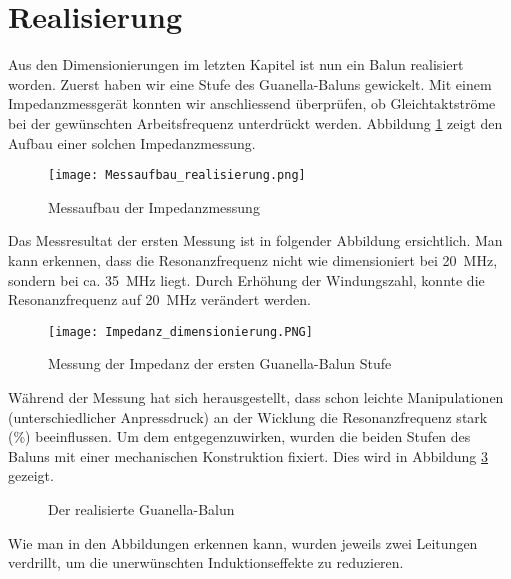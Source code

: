 \section{Realisierung}
Aus den Dimensionierungen im letzten Kapitel ist nun ein Balun realisiert worden. Zuerst haben wir eine Stufe des Guanella-Baluns gewickelt. Mit einem Impedanzmessgerät konnten wir anschliessend überprüfen, ob Gleichtaktströme bei der gewünschten Arbeitsfrequenz unterdrückt werden. Abbildung \ref{fig:mess_real} zeigt den Aufbau einer solchen Impedanzmessung.
\begin{figure}[H]
	\centering
	\texttt{[image: Messaufbau\_realisierung.png]}
	\caption{Messaufbau der Impedanzmessung}\label{fig:mess_real}
\end{figure}

Das Messresultat der ersten Messung ist in folgender Abbildung ersichtlich. Man kann erkennen, dass die Resonanzfrequenz nicht wie dimensioniert bei \SI{20}{MHz}, sondern bei ca. \SI{35}{MHz} liegt. Durch Erhöhung der Windungszahl, konnte die Resonanzfrequenz auf \SI{20}{MHz} verändert werden.
\begin{figure}[H]
	\centering
	\texttt{[image: Impedanz\_dimensionierung.PNG]}
	\caption{Messung der Impedanz der ersten Guanella-Balun Stufe}\label{fig:imp_dim}
\end{figure}

Während der Messung hat sich herausgestellt, dass schon leichte Manipulationen (unterschiedlicher Anpressdruck) an der Wicklung die Resonanzfrequenz stark (\%) beeinflussen. Um dem entgegenzuwirken, wurden die beiden Stufen des Baluns mit einer mechanischen Konstruktion fixiert. Dies wird in Abbildung \ref{fig:balun} gezeigt.
\begin{figure}[H]
	\centering
	\qquad
	\qquad
	\caption{Der realisierte Guanella-Balun}
	\label{fig:balun}
\end{figure}
Wie man in den Abbildungen erkennen kann, wurden jeweils zwei Leitungen verdrillt, um die unerwünschten Induktionseffekte zu reduzieren.
